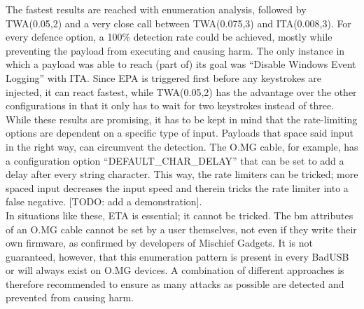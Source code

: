 The fastest results are reached with enumeration analysis, followed by TWA(0.05,2) and a very close call between TWA(0.075,3) and ITA(0.008,3). For every defence option, a 100\% detection rate could be achieved, mostly while preventing the payload from executing and causing harm. The only instance in which a payload was able to reach (part of) its goal was ``Disable Windows Event Logging'' with ITA. Since EPA is triggered first before any keystrokes are injected, it can react fastest, while TWA(0.05,2) has the advantage over the other configurations in that it only has to wait for two keystrokes instead of three. \\
While these results are promising, it has to be kept in mind that the rate-limiting options are dependent on a specific type of input. Payloads that space said input in the right way, can circumvent the detection. The O.MG cable, for example, has a configuration option ``DEFAULT\_CHAR\_DELAY'' that can be set to add a delay after every string character. This way, the rate limiters can be tricked; more spaced input decreases the input speed and therein tricks the rate limiter into a false negative. [TODO: add a demonstration]. \\
In situations like these, ETA is essential; it cannot be tricked. The bm attributes of an O.MG cable cannot be set by a user themselves, not even if they write their own firmware, as confirmed by developers of Mischief Gadgets. It is not guaranteed, however, that this enumeration pattern is present in every BadUSB or will always exist on O.MG devices. A combination of different approaches is therefore recommended to ensure as many attacks as possible are detected and prevented from causing harm. 

